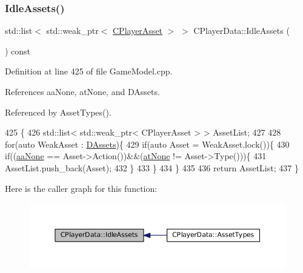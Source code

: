 \subsubsection{\texorpdfstring{Idle\+Assets()}{IdleAssets()}}
{\footnotesize\ttfamily std\+::list$<$ std\+::weak\+\_\+ptr$<$ \hyperlink{classCPlayerAsset}{C\+Player\+Asset} $>$ $>$ C\+Player\+Data\+::\+Idle\+Assets (\begin{DoxyParamCaption}{ }\end{DoxyParamCaption}) const}



Definition at line 425 of file Game\+Model.\+cpp.



References aa\+None, at\+None, and D\+Assets.



Referenced by Asset\+Types().


\begin{DoxyCode}
425                                                                     \{
426     std::list< std::weak\_ptr< CPlayerAsset > > AssetList;
427     
428     \textcolor{keywordflow}{for}(\textcolor{keyword}{auto} WeakAsset : \hyperlink{classCPlayerData_a1d7dd355facf52db6242e3554373906c}{DAssets})\{
429         \textcolor{keywordflow}{if}(\textcolor{keyword}{auto} Asset = WeakAsset.lock())\{
430             \textcolor{keywordflow}{if}((\hyperlink{GameDataTypes_8h_ab47668e651a3032cfb9c40ea2d60d670ac17cc5a0035320c060d7f8074143b507}{aaNone} == Asset->Action())&&(\hyperlink{GameDataTypes_8h_a5600d4fc433b83300308921974477feca82fb51718e2c00981a2d37bc6fe92593}{atNone} != Asset->Type()))\{
431                 AssetList.push\_back(Asset);
432             \}
433         \}
434     \}
435     
436     \textcolor{keywordflow}{return} AssetList;
437 \}
\end{DoxyCode}
Here is the caller graph for this function\+:\nopagebreak
\begin{figure}[H]
\begin{center}
\leavevmode
\includegraphics[width=350pt]{classCPlayerData_a5bd2ebe2e3dc25669bb312226e087fd1_icgraph}
\end{center}
\end{figure}
\hypertarget{classCPlayerData_a6fbfd47b568e721df80644689f8dd172}{}\label{classCPlayerData_a6fbfd47b568e721df80644689f8dd172} 
